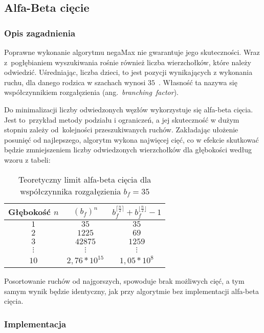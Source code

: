\subsection{Alfa-Beta cięcie}
\label{subsec:alfa-beta-ciecie}
\subsubsection{Opis zagadnienia}
Poprawne wykonanie algorytmu negaMax nie gwarantuje jego skuteczności.
Wraz z~pogłębianiem wyszukiwania rośnie również liczba wierzchołków, które należy odwiedzić.
Uśredniając, liczba dzieci, to jest pozycji wynikających z wykonania ruchu, dla danego rodzica w szachach wynosi $35$~\cite*{branching-factor}.
Własność ta nazywa się współczynnikiem rozgałęzienia (ang.~\textit{branching~factor}).

Do minimalizacji liczby odwiedzonych węzłów wykorzystuje się alfa-beta cięcia.
Jest to~przykład metody podziału i ograniczeń, a jej skuteczność w dużym stopniu zależy od~kolejności przeszukiwanych ruchów.
Zakładając ułożenie posunięć od najlepszego, algorytm wykona najwięcej cięć, co w efekcie skutkować będzie zmniejszeniem liczby odwiedzonych wierzchołków dla głębokości według wzoru z tabeli:

\begin{table}[htb] \small
\centering
\caption{Teoretyczny limit alfa-beta cięcia dla współczynnika rozgałęzienia $b_f = 35$}
\label{tab:alfa-beat-limit}
\renewcommand{\arraystretch}{1.5}
\begin{tabular}{|c|c|c|}\hline
Głębokość $n$ & $({b_{f}})^{n}$ & $b_{f}^{\lceil \frac{n}{2} \rceil} + b_{f}^{\lfloor \frac{n}{2} \rfloor} - 1$\\ \hline\hline

$1$ & $35$ & $35$\\ \hline
$2$ & $1225$ & $69$\\ \hline
$3$ & $42 875$ & $1259$\\ \hline
$\vdots$ & $\vdots$ & $\vdots$\\ \hline
$10$ & $2,76 * 10^{15}$ & $1,05 * 10^{8}$\\ \hline

\end{tabular}
\end{table}

Posortowanie ruchów od najgorszych, spowoduje brak możliwych cięć, a tym samym wynik będzie identyczny, jak przy algorytmie bez implementacji alfa-beta cięcia.


\subsubsection{Implementacja}


